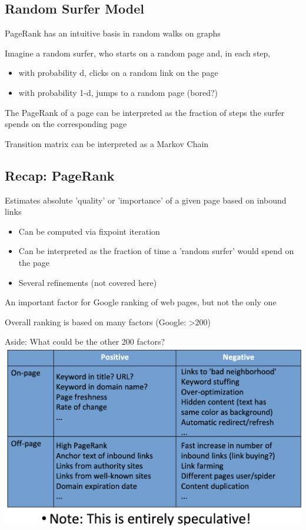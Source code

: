 \documentclass[11pt]{article}
\theoremstyle{definition}
\begin{document}
\subsection{Random Surfer Model}
PageRank has an intuitive basis in random walks on graphs

Imagine a random surfer, who starts on a random page and, in each
step,

\begin{itemize}
    \item with probability d, clicks on a random link on the page
    \item with probability 1-d, jumps to a random page (bored?)
\end{itemize}

The PageRank of a page can be interpreted as the fraction of steps the
surfer spends on the corresponding page

Transition matrix can be interpreted as a Markov Chain

\subsection{Recap: PageRank}
Estimates absolute 'quality' or 'importance' of a given
page based on inbound links

\begin{itemize}
    \item Can be computed via fixpoint iteration
    \item Can be interpreted as the fraction of time a 'random
    surfer' would spend on the page
    \item Several refinements (not covered here)
\end{itemize}

An important factor for Google ranking of web pages, but
not the only one

Overall ranking is based on many factors (Google: >200)

Aside: What could be the other
200 factors?
\includegraphics[width=\textwidth/2]{36.png}
\end{document}
